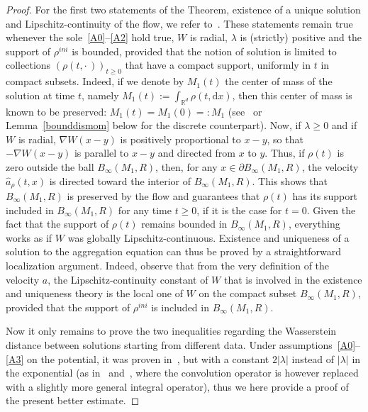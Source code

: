 \documentclass[11pt]{article}
\theoremstyle{definition}
\numberwithin{equation}{section}
\newcommand*{\dd}{\mathrm{d}}
\newcommand*{\dx}{\dd x}
\newcommand*\RR{\mathbb{R}}
\newcommand*\achapo{\widehat{a}}
\begin{document}
\begin{proof}
For the first two statements of the Theorem, existence of a unique solution and Lipschitz-continuity of the flow, we refer to~\cite{CJLV}. These statements remain true whenever the sole~\eqref{A0}--\eqref{A2} hold true, $W$ is radial, $\lambda$ is (strictly) positive and the support of $\rho^{ini}$ is bounded, provided that the notion of solution is limited to collections $(\rho(t,{\cdot\,}))_{t \geq 0}$ that have a compact support, uniformly in $t$ in compact subsets. Indeed, if we denote by $M_1(t)$ the center of mass of the solution at time $t$, namely $M_1(t) := \int_{\RR^d} \rho(t,\dx)$, then this center of mass is known to be preserved: $M_1(t) = M_1(0) =: M_1$ (see~\cite{CJLV} or Lemma~\ref{bounddismom} below for the discrete counterpart). Now, if $\lambda \geq 0$ and if $W$ is radial, $\nabla W(x - y)$ is positively proportional to $x-y$, so that $-\nabla W(x - y)$ is parallel to $x - y$ and directed from $x$ to $y$. Thus, if $\rho(t)$ is zero outside the ball $B_\infty(M_1,R)$, then, for any $x \in \partial B_\infty(M_1,R)$, the velocity $\achapo_\rho(t,x)$ is directed toward the interior of $B_\infty(M_1,R)$. This shows that $B_\infty(M_1,R)$ is preserved by the flow and guarantees that $\rho(t)$ has its support included in $B_\infty(M_1,R)$ for any time $t \geq 0$, if it is the case for $t = 0$. Given the fact that the support of $\rho(t)$ remains bounded in $B_\infty(M_1,R)$, everything works as if $W$ was globally Lipschitz-continuous. Existence and uniqueness of a solution to the aggregation equation can thus be proved by a straightforward localization argument. Indeed, observe that from the very definition of the velocity $a$, the Lipschitz-continuity constant of $W$ that is involved in the existence and uniqueness theory is the local one of $W$ on the compact subset $B_{\infty}(M_{1},R)$, provided that the support of $\rho^{ini}$ is included in $B_{\infty}(M_{1},R)$.

Now it only remains to prove the two inequalities regarding the Wasserstein distance between solutions starting from different data. Under assumptions~\eqref{A0}--\eqref{A3} on the potential, it was proven in~\cite{CJLV}, but with a constant $2|\lambda|$ instead of $|\lambda|$ in the exponential (as in~\cite{dob} and~\cite {Golse}, where the convolution operator is however replaced with a slightly more general integral operator), thus we here provide a proof of the present better estimate.


\end{proof}
\end{document}
